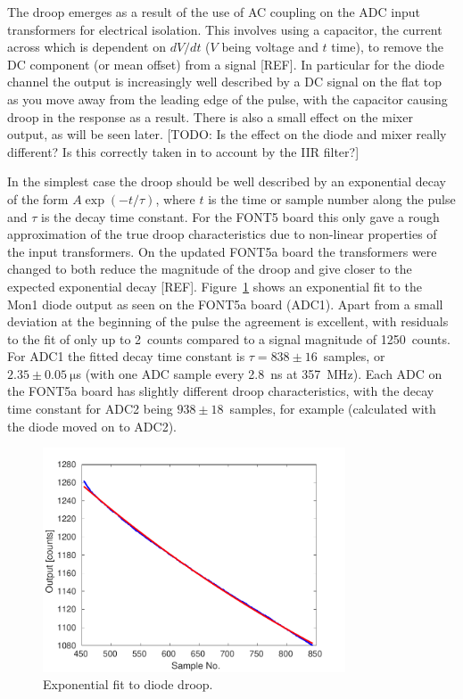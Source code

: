 The droop emerges as a result of the use of AC coupling on the ADC input transformers for electrical isolation. This involves using a capacitor, the current across which is dependent on \({dV}/{dt}\) (\(V\) being voltage and \(t\) time), to remove the DC component (or mean offset) from a signal [REF]. In particular for the diode channel the output is increasingly well described by a DC signal on the flat top as you move away from the leading edge of the pulse, with the capacitor causing droop in the response as a result. There is also a small effect on the mixer output, as will be seen later. [TODO: Is the effect on the diode and mixer really different? Is this correctly taken in to account by the IIR filter?]

In the simplest case the droop should be well described by an exponential decay of the form \(A\exp\left(-t/\tau\right)\), where \(t\) is the time or sample number along the pulse and \(\tau\) is the decay time constant. For the FONT5 board this only gave a rough approximation of the true droop characteristics due to non-linear properties of the input transformers. On the updated FONT5a board the transformers were changed to both reduce the magnitude of the droop and give closer to the expected exponential decay [REF]. Figure~\ref{f:iirDiodeFit} shows an exponential fit to the Mon1 diode output as seen on the FONT5a board (ADC1). Apart from a small deviation at the beginning of the pulse the agreement is excellent, with residuals to the fit of only up to 2~counts compared to a signal magnitude of 1250~counts. For ADC1 the fitted decay time constant is \(\tau = 838\pm16\)~samples, or \(2.35\pm0.05~\mathrm{\mu}\)s (with one ADC sample every 2.8~ns at 357~MHz). Each ADC on the FONT5a board has slightly different droop characteristics, with the decay time constant for ADC2 being \(938\pm18\)~samples, for example (calculated with the diode moved on to ADC2).

\begin{figure}
  \centering
  \includegraphics[width=0.8\textwidth]{Figures/commissioning/iirDiodeFit}
  \caption{Exponential fit to diode droop.}
  \label{f:iirDiodeFit}
\end{figure}


